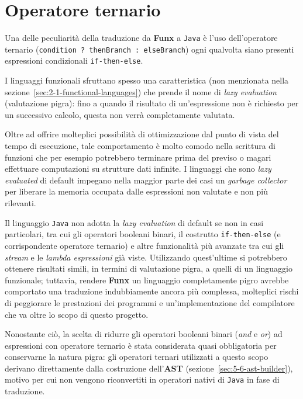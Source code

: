 \section{Operatore ternario}
\label{sec:4-2-ternary-operator}

Una delle peculiarità della traduzione da \textbf{Funx} a \texttt{Java} è l'uso dell'operatore ternario
(\texttt{condition ? thenBranch : elseBranch}) ogni qualvolta
siano presenti espressioni condizionali \texttt{if-then-else}.

I linguaggi funzionali sfruttano spesso una caratteristica (non menzionata nella sezione~\ref{sec:2-1-functional-languages})
che prende il nome di \textit{lazy evaluation} (valutazione pigra): fino a quando il risultato di un'espressione
non è richiesto per un successivo calcolo, questa non verrà completamente valutata.

\noindent Oltre ad offrire molteplici possibilità di ottimizzazione dal punto di vista del tempo di esecuzione,
tale comportamento è molto comodo nella scrittura di funzioni che per esempio potrebbero terminare
prima del previso o magari effettuare computazioni su strutture dati infinite.
I linguaggi che sono \textit{lazy evaluated} di default impegano nella maggior parte dei casi un \textit{garbage collector}
per liberare la memoria occupata dalle espressioni non valutate e non più rilevanti.

Il linguaggio \texttt{Java} non adotta la \textit{lazy evaluation} di default se non in casi particolari, tra cui
gli operatori booleani binari, il costrutto \texttt{if-then-else} (e corrispondente operatore ternario) e altre
funzionalità più avanzate tra cui gli \textit{stream} e le \textit{lambda espressioni} già viste.
Utilizzando quest'ultime si potrebbero ottenere risultati simili, in termini di valutazione pigra, a quelli di un linguaggio funzionale;
tuttavia, rendere \textbf{Funx} un linguaggio completamente pigro avrebbe comportato una traduzione indubbiamente ancora più complessa,
molteplici rischi di peggiorare le prestazioni dei programmi e un'implementazione del compilatore che va oltre lo scopo di questo progetto.

Nonostante ciò, la scelta di ridurre gli operatori booleani binari (\textit{and} e \textit{or}) ad espressioni con operatore ternario
è stata considerata quasi obbligatoria per conservarne la natura pigra: gli operatori ternari utilizzati a questo scopo
derivano direttamente dalla costruzione dell'\textbf{AST} (sezione~\ref{sec:5-6-ast-builder}), motivo per cui non vengono riconvertiti
in operatori nativi di \texttt{Java} in fase di traduzione.

